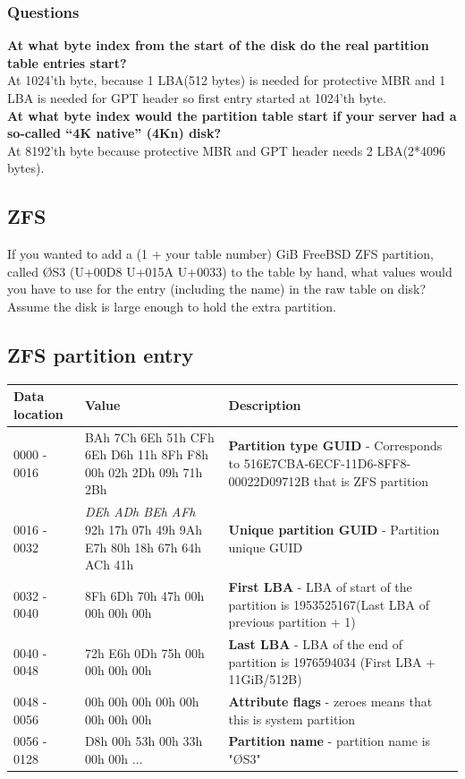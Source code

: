 \documentclass[a4paper,11pt]{article}
\theoremstyle{mytheor}
\begin{document}
\subsubsection{Questions}

\textbf{At what byte index from the start of the disk do the real partition table entries start?}\\
At 1024'th byte, because 1 LBA(512 bytes) is needed for protective MBR and 1 LBA is needed for GPT header so first entry started at 1024'th byte.\\
\textbf{At what byte index would the partition table start if your server had a so-called “4K native”
(4Kn) disk?}\\
At 8192'th byte because protective MBR and GPT header needs 2 LBA(2*4096 bytes).


\subsection{ZFS}

If you wanted to add a (1 + your table number) GiB FreeBSD ZFS partition, called ØS3 (U+00D8
U+015A U+0033) to the table by hand, what values would you have to use for the entry (including the name) in
the raw table on disk? Assume the disk is large enough to hold the extra partition.

\subsection{ZFS partition entry}
\begin{longtable}{| p{3cm} | p{2cm} | p{10cm} |} \hline
  Data location & Value & Description\\ \hline
  0000 - 0016 & BAh 7Ch 6Eh 51h CFh 6Eh D6h 11h 8Fh F8h 00h 02h 2Dh 09h 71h 2Bh & \textbf{Partition type GUID} - Corresponds to 516E7CBA-6ECF-11D6-8FF8-00022D09712B that is ZFS partition\\ \hline
  0016 - 0032 & \textit{DEh ADh BEh AFh} 92h 17h 07h 49h 9Ah E7h 80h 18h 67h 64h ACh 41h & \textbf{Unique partition GUID} - Partition unique GUID\\ \hline
  0032 - 0040 & 8Fh 6Dh 70h 47h 00h 00h 00h 00h & \textbf{First LBA} - LBA of start of the partition is 1953525167(Last LBA of previous partition + 1)\\ \hline
  0040 - 0048 & 72h E6h 0Dh 75h 00h 00h 00h 00h & \textbf{Last LBA} - LBA of the end of partition is 1976594034 (First LBA + 11GiB/512B)\\ \hline
  0048 - 0056 & 00h 00h 00h 00h 00h 00h 00h 00h & \textbf{Attribute flags} - zeroes means that this is system partition\\ \hline
  0056 - 0128 & D8h 00h 53h 00h 33h 00h 00h ... & \textbf{Partition name} - partition name is "ØS3" \\ \hline
\end{longtable}
\end{document}
